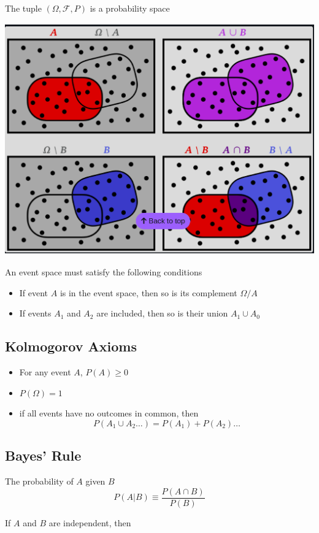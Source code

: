\documentclass[fleqn]{report}
\begin{document}
The tuple $(\Omega, \mathcal F, P)$ is a probability space 

\includegraphics[width = 14cm, height = 10cm]{PHYS498.1.png}

An event space must satisfy the following conditions
\begin{itemize}
    \item 
    If event $A$ is in the event space, then so is its complement $\Omega / A$
    \item 
    If events $A_1$ and $A_2$ are included, then so is their union $A_1 \cup A_0$
\end{itemize}

\subsection{Kolmogorov Axioms}
\begin{itemize}
    \item 
    For any event $A$, $P(A) \geq 0$ 
    \item 
    $P(\Omega) = 1$
    \item 
    if all events have no outcomes in common, then 
    \[
    P(A_1 \cup A_2 \ldots ) = P(A_1) + P(A_2) \ldots
    \]
\end{itemize}

\subsection{Bayes' Rule}
The probability of $A$ given $B$ 
\[
P(A | B) \equiv \frac{P(A \cap B)}{P(B)}
\]

If $A$ and $B$ are independent, then 
\end{document}
